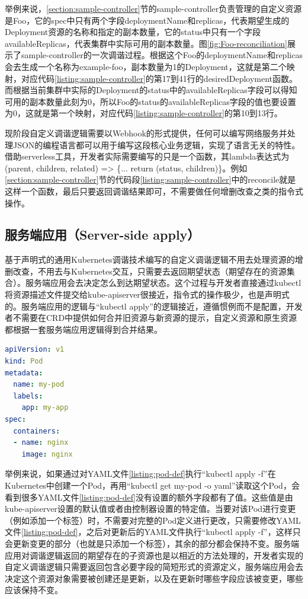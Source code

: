 \documentclass[macfonts,master]{njuthesis}
\begin{document}
举例来说，\ref{section:sample-controller}节的sample-controller负责管理的自定义资源是Foo，它的spec中只有两个字段deploymentName和replicas，代表期望生成的Deployment资源的名称和指定的副本数量，它的status中只有一个字段availableReplicas，代表集群中实际可用的副本数量。图\ref{fig:Foo-reconciliation}展示了sample-controller的一次调谐过程。根据这个Foo的deploymentName和replicas会去生成一个名称为example-foo，副本数量为1的Deployment，这就是第二个映射，对应代码\ref{listing:sample-controller}的第17到41行的desiredDeployment函数。而根据当前集群中实际的Deployment的status中的availableReplicas字段可以得知可用的副本数量此刻为0，所以Foo的status的availableReplicas字段的值也要设置为0，这就是第一个映射，对应代码\ref{listing:sample-controller}的第10到13行。

现阶段自定义调谐逻辑需要以Webhook的形式提供，任何可以编写网络服务并处理JSON的编程语言都可以用于编写这段核心业务逻辑，实现了语言无关的特性。借助serverless工具，开发者实际需要编写的只是一个函数，其lambda表达式为(parent, children, related) => \{... return (status, children)\}。例如\ref{section:sample-controller}节的代码段\ref{listing:sample-controller}中的reconcile就是这样一个函数，最后只要返回调谐结果即可，不需要做任何增删改查之类的指令式操作。

\subsection{服务端应用（Server-side apply）}

基于声明式的通用Kubernetes调谐技术编写的自定义调谐逻辑不用去处理资源的增删改查，不用去与Kubernetes交互，只需要去返回期望状态（期望存在的资源集合）。服务端应用会去决定怎么到达期望状态。这个过程与开发者直接通过kubectl将资源描述文件提交给kube-apiserver很接近，指令式的操作极少，也是声明式的。服务端应用的逻辑与``kubectl apply''的逻辑接近，遵循惯例而不是配置，开发者不需要在CRD中提供如何合并旧资源与新资源的提示，自定义资源和原生资源都根据一套服务端应用逻辑得到合并结果。

\begin{lstlisting}[language=yaml,caption=一个Pod的定义文件,label=listing:pod-def]
apiVersion: v1
kind: Pod
metadata:
  name: my-pod
  labels:
    app: my-app
spec:
  containers:
  - name: nginx
    image: nginx
\end{lstlisting}

举例来说，如果通过对YAML文件\ref{listing:pod-def}执行``kubectl apply -f''在Kubernetes中创建一个Pod，再用``kubectl get my-pod -o yaml''读取这个Pod，会看到很多YAML文件\ref{listing:pod-def}没有设置的额外字段都有了值。这些值是由kube-apiserver设置的默认值或者由控制器设置的特定值。当要对该Pod进行变更（例如添加一个标签）时，不需要对完整的Pod定义进行更改，只需要修改YAML文件\ref{listing:pod-def}，之后对更新后的YAML文件执行``kubectl apply -f''，这样只会更新变更的部分（也就是只添加一个标签），其余的部分都会保持不变。服务端应用对调谐逻辑返回的期望存在的子资源也是以相近的方法处理的，开发者实现的自定义调谐逻辑只需要返回包含必要字段的简短形式的资源定义，服务端应用会去决定这个资源对象需要被创建还是更新，以及在更新时哪些字段应该被变更，哪些应该保持不变。
\end{document}
